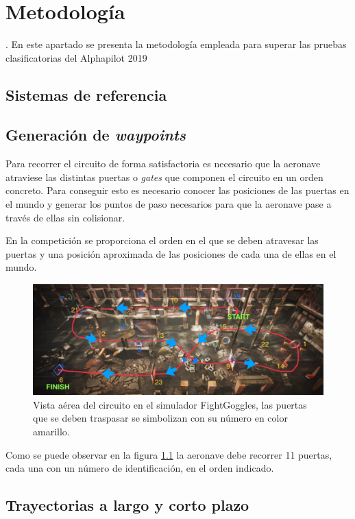 \chapter{Metodología}
	
. En este apartado se presenta la metodología empleada para superar las pruebas clasificatorias del Alphapilot 2019 

\section{Sistemas de referencia}


\section{Generación de \textit{waypoints}}
Para recorrer el circuito de forma satisfactoria es necesario que la aeronave atraviese las distintas puertas o \textit{gates} que componen el circuito en un orden concreto. Para conseguir esto es necesario conocer las posiciones de las puertas en el mundo y generar los puntos de paso necesarios para que la aeronave pase a través de ellas sin colisionar.

En la competición se proporciona el orden en el que se deben atravesar las puertas y una posición aproximada de las posiciones de cada una de ellas en el mundo. 

\begin{figure}[htb!]
	\centering
	\includegraphics[width=\textwidth]{imagenes/diagramacircuito}
	\caption{Vista aérea del circuito en el simulador FightGoggles, las puertas que se deben traspasar se simbolizan con su número en color amarillo.}
	\label{waypoints:circuito}
\end{figure}

Como se puede observar en la figura \ref{waypoints:circuito} la aeronave debe recorrer 11 puertas, cada una con un número de identificación, en el orden indicado. 








\section{Trayectorias a largo y corto plazo}

